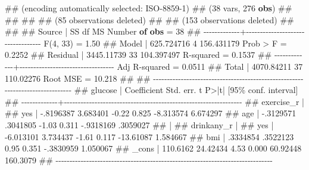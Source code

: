 \documentclass[
  letterpaper,
  DIV=11,
  numbers=noendperiod]{scrreprt}
\newenvironment{Shaded}{\begin{snugshade}}{\end{snugshade}}
\newcommand{\DataTypeTok}[1]{\textcolor[rgb]{0.68,0.00,0.00}{#1}}
\newcommand{\FunctionTok}[1]{\textcolor[rgb]{0.28,0.35,0.67}{#1}}
\newcommand{\KeywordTok}[1]{\textcolor[rgb]{0.00,0.23,0.31}{\textbf{#1}}}
\newcommand{\NormalTok}[1]{\textcolor[rgb]{0.00,0.23,0.31}{#1}}
\begin{document}
\begin{Shaded}
\begin{Highlighting}[]
\NormalTok{\#\# (encoding automatically selected: ISO{-}8859{-}1)}
\NormalTok{\#\# (38 vars, 276 }\KeywordTok{obs}\NormalTok{)}
\NormalTok{\#\# }
\NormalTok{\#\# }
\NormalTok{\#\# }
\NormalTok{\#\# (85 observations deleted)}
\NormalTok{\#\# }
\NormalTok{\#\# (153 observations deleted)}
\NormalTok{\#\# }
\NormalTok{\#\# }
\NormalTok{\#\#       Source |       SS           df       MS      Number }\KeywordTok{of} \KeywordTok{obs}\NormalTok{   =        38}
\NormalTok{\#\# {-}{-}{-}{-}{-}{-}{-}{-}{-}{-}{-}{-}{-}+{-}{-}{-}{-}{-}{-}{-}{-}{-}{-}{-}{-}{-}{-}{-}{-}{-}{-}{-}{-}{-}{-}{-}{-}{-}{-}{-}{-}{-}{-}{-}{-}{-}{-}   }\FunctionTok{F}\NormalTok{(4, 33)        =      1.50}
\NormalTok{\#\#        Model |  625.724716         4  156.431179   Prob \textgreater{} }\FunctionTok{F}\NormalTok{        =    0.2252}
\NormalTok{\#\#     Residual |  3445.11739        33  104.397497   R{-}squared       =    0.1537}
\NormalTok{\#\# {-}{-}{-}{-}{-}{-}{-}{-}{-}{-}{-}{-}{-}+{-}{-}{-}{-}{-}{-}{-}{-}{-}{-}{-}{-}{-}{-}{-}{-}{-}{-}{-}{-}{-}{-}{-}{-}{-}{-}{-}{-}{-}{-}{-}{-}{-}{-}   Adj R{-}squared   =    0.0511}
\NormalTok{\#\#        Total |  4070.84211        37   110.02276   Root MSE        =    10.218}
\NormalTok{\#\# }
\NormalTok{\#\# {-}{-}{-}{-}{-}{-}{-}{-}{-}{-}{-}{-}{-}{-}{-}{-}{-}{-}{-}{-}{-}{-}{-}{-}{-}{-}{-}{-}{-}{-}{-}{-}{-}{-}{-}{-}{-}{-}{-}{-}{-}{-}{-}{-}{-}{-}{-}{-}{-}{-}{-}{-}{-}{-}{-}{-}{-}{-}{-}{-}{-}{-}{-}{-}{-}{-}{-}{-}{-}{-}{-}{-}{-}{-}{-}{-}{-}{-}}
\NormalTok{\#\#      glucose | Coefficient  Std. err.      t    P\textgreater{}|t|     [95\% conf. interval]}
\NormalTok{\#\# {-}{-}{-}{-}{-}{-}{-}{-}{-}{-}{-}{-}{-}+{-}{-}{-}{-}{-}{-}{-}{-}{-}{-}{-}{-}{-}{-}{-}{-}{-}{-}{-}{-}{-}{-}{-}{-}{-}{-}{-}{-}{-}{-}{-}{-}{-}{-}{-}{-}{-}{-}{-}{-}{-}{-}{-}{-}{-}{-}{-}{-}{-}{-}{-}{-}{-}{-}{-}{-}{-}{-}{-}{-}{-}{-}{-}{-}}
\NormalTok{\#\#   exercise\_r |}
\NormalTok{\#\#         yes  |  {-}.8196387   3.683401    {-}0.22   0.825    {-}8.313574    6.674297}
\NormalTok{\#\#          age |  {-}.3129571   .3041805    {-}1.03   0.311    {-}.9318169    .3059027}
\NormalTok{\#\#              |}
\NormalTok{\#\#   drinkany\_r |}
\NormalTok{\#\#         yes  |  {-}6.013101   3.734437    {-}1.61   0.117    {-}13.61087    1.584667}
\NormalTok{\#\#          bmi |   .3334854   .3522123     0.95   0.351    {-}.3830959    1.050067}
\NormalTok{\#\#        }\DataTypeTok{\_cons}\NormalTok{ |   110.6162   24.42434     4.53   0.000     60.92448    160.3079}
\NormalTok{\#\# {-}{-}{-}{-}{-}{-}{-}{-}{-}{-}{-}{-}{-}{-}{-}{-}{-}{-}{-}{-}{-}{-}{-}{-}{-}{-}{-}{-}{-}{-}{-}{-}{-}{-}{-}{-}{-}{-}{-}{-}{-}{-}{-}{-}{-}{-}{-}{-}{-}{-}{-}{-}{-}{-}{-}{-}{-}{-}{-}{-}{-}{-}{-}{-}{-}{-}{-}{-}{-}{-}{-}{-}{-}{-}{-}{-}{-}{-}}
\end{Highlighting}
\end{Shaded}
\end{document}
